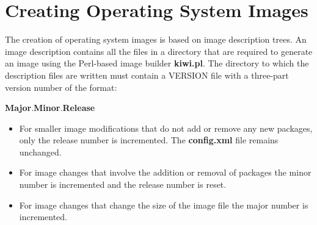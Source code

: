 \chapter{Creating Operating System Images}
\label{chapter:cropsysimg}
\minitoc

The creation of operating system images is based on image description
trees. An image description contains all the files in a directory that
are required to generate an image using the Perl-based image builder
\textbf{kiwi.pl}. The directory to which the description files are
written must contain a VERSION file with a three-part version number of
the format:

\begin{Command}{9cm}
\textbf{Major}.\textbf{Minor}.\textbf{Release}
\end{Command}

\begin{itemize}
\item For smaller image modifications that do not add or remove any
      new packages, only the release number is incremented.
      The \textbf{config.xml} file remains unchanged.
\item For image changes that involve the addition or removal of packages
      the minor number is incremented and the release number is reset.
\item For image changes that change the size of the image file
      the major number is incremented.
\end{itemize}

